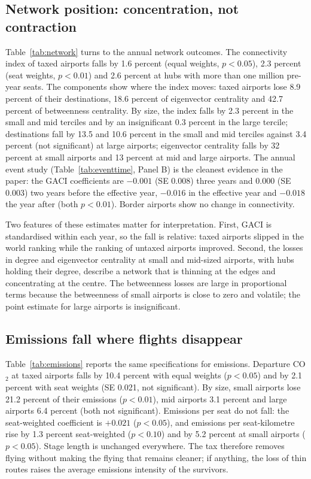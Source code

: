 \subsection{Network position: concentration, not contraction}

Table~\ref{tab:network} turns to the annual network outcomes. The connectivity index of taxed airports
falls by 1.6 percent (equal weights, $p<0.05$), 2.3 percent (seat weights, $p<0.01$) and 2.6 percent at
hubs with more than one million pre-year seats. The components show where the index moves: taxed
airports lose 8.9 percent of their destinations, 18.6 percent of eigenvector centrality and 42.7
percent of betweenness centrality. By size, the index falls by 2.3 percent in the small and mid terciles
and by an insignificant 0.3 percent in the large tercile; destinations fall by 13.5 and 10.6 percent in
the small and mid terciles against 3.4 percent (not significant) at large airports; eigenvector
centrality falls by 32 percent at small airports and 13 percent at mid and large airports. The annual
event study (Table~\ref{tab:eventtime}, Panel B) is the cleanest evidence in the paper: the GACI
coefficients are $-0.001$ (SE 0.008) three years and $0.000$ (SE 0.003) two years before the effective
year, $-0.016$ in the effective year and $-0.018$ the year after (both $p<0.01$). Border airports show
no change in connectivity.

Two features of these estimates matter for interpretation. First, GACI is standardised within each
year, so the fall is relative: taxed airports slipped in the world ranking while the ranking of untaxed
airports improved. Second, the losses in degree and eigenvector centrality at small and mid-sized
airports, with hubs holding their degree, describe a network that is thinning at the edges and
concentrating at the centre. The betweenness losses are large in proportional terms because the
betweenness of small airports is close to zero and volatile; the point estimate for large airports is
insignificant.

\subsection{Emissions fall where flights disappear}

Table~\ref{tab:emissions} reports the same specifications for emissions. Departure CO$_2$ at taxed
airports falls by 10.4 percent with equal weights ($p<0.05$) and by 2.1 percent with seat weights (SE
0.021, not significant). By size, small airports lose 21.2 percent of their emissions ($p<0.01$), mid
airports 3.1 percent and large airports 6.4 percent (both not significant). Emissions per seat do not
fall: the seat-weighted coefficient is $+0.021$ ($p<0.05$), and emissions per seat-kilometre rise by
1.3 percent seat-weighted ($p<0.10$) and by 5.2 percent at small airports ($p<0.05$). Stage length is
unchanged everywhere. The tax therefore removes flying without making the flying that remains cleaner;
if anything, the loss of thin routes raises the average emissions intensity of the survivors.

